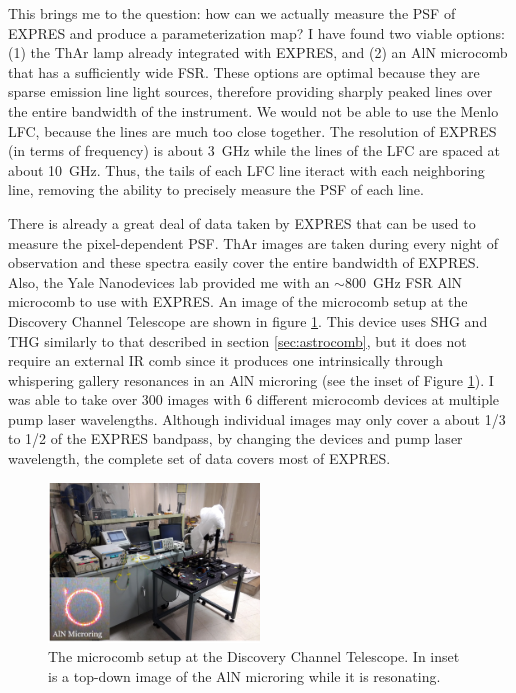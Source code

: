 \documentclass[11pt]{article}
\begin{document}
This brings me to the question: how can we actually measure the PSF of EXPRES and produce a parameterization map? I have found two viable options: (1) the ThAr lamp already integrated with EXPRES, and (2) an AlN microcomb that has a sufficiently wide FSR. These options are optimal because they are sparse emission line light sources, therefore providing sharply peaked lines over the entire bandwidth of the instrument. We would not be able to use the Menlo LFC, because the lines are much too close together. The resolution of EXPRES (in terms of frequency) is about \SI{3}{\giga\hertz} while the lines of the LFC are spaced at about \SI{10}{\giga\hertz}. Thus, the tails of each LFC line iteract with each neighboring line, removing the ability to precisely measure the PSF of each line.

There is already a great deal of data taken by EXPRES that can be used to measure the pixel-dependent PSF. ThAr images are taken during every night of observation and these spectra easily cover the entire bandwidth of EXPRES. Also, the Yale Nanodevices lab provided me with an $\sim$\SI{800}{\giga\hertz} FSR AlN microcomb to use with EXPRES. An image of the microcomb setup at the Discovery Channel Telescope are shown in figure \ref{fig:aln_setup}. This device uses SHG and THG similarly to that described in section \ref{sec:astrocomb}, but it does not require an external IR comb since it produces one intrinsically through whispering gallery resonances in an AlN microring (see the inset of Figure \ref{fig:aln_setup}). I was able to take over 300 images with 6 different microcomb devices at multiple pump laser wavelengths. Although individual images may only cover a about 1/3 to 1/2 of the EXPRES bandpass, by changing the devices and pump laser wavelength, the complete set of data covers most of EXPRES.

\begin{figure}
    \centering
    \includegraphics[width=0.5\textwidth]{images/aln_setup.png}
    \caption{The microcomb setup at the Discovery Channel Telescope. In inset is a top-down image of the AlN microring while it is resonating.}
    \label{fig:aln_setup}
\end{figure}
\end{document}
